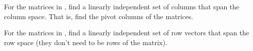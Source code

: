 \documentclass{ximera}
\begin{document}
\begin{exercise}
    For the matrices in , find a linearly independent set of columns that span the column space. That is, find the pivot columns of the matrices.
\end{exercise}

\begin{exercise}%
    For the matrices in , find a linearly independent set of row vectors that span the row space (they don't need to be rows of the matrix).
\end{exercise}
\end{document}
